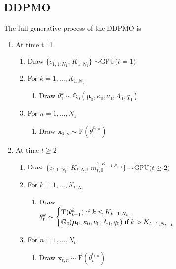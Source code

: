 \documentclass{article}
\begin{document}
\subsection{DDPMO}
\label{sec:ddpmoo_def}
The full generative process of the DDPMO is
\begin{enumerate}
    \item At time t=1
    \begin{enumerate}
        \item Draw $\{ c_{1,1:N_1}$, $K_{1,N_1} \}$ $\sim \text{GPU($t=1$)}$
        \item For $k=1,\ldots,K_{1,N_1}$
        \begin{enumerate}
            \item Draw $\theta_1^k \sim \mathbb{G}_0(\boldsymbol{\mu}_0,\kappa_0,\nu_0,\Lambda_0,q_0)$
        \end{enumerate}
        \item For $n=1,\ldots,N_1$
        \begin{enumerate}
            \item Draw $\mathbf{x}_{1,n} \sim \text{F}(\theta_1^{c_{1,n}})$
        \end{enumerate}
    \end{enumerate}
    \item At time $t \geq 2$
    \begin{enumerate}
        \item Draw $\{ c_{t,1:N_t}$, $K_{t,N_t}$, $m_{t,0}^{1:K_{t-1,N_{t-1}}} \}$ $\sim \text{GPU($t \geq 2$)}$
        \item For $k=1,\ldots,K_{t,N_t}$
        \begin{enumerate}
            \item Draw \\$\theta_t^k \sim
                \begin{cases}
                    \text{T}(\theta_{t-1}^k) \hspace{1mm} \text{if} \hspace{1mm} k \leq K_{t-1,N_{t-1}} \\
                    \mathbb{G}_0(\boldsymbol{\mu}_0,\kappa_0,\nu_0,\Lambda_0,q_0) \hspace{1mm} \text{if} \hspace{1mm} k > K_{t-1,N_{t-1}}
                \end{cases}$
        \end{enumerate}
        \item For $n=1,\ldots,N_t$
        \begin{enumerate}
            \item Draw $\mathbf{x}_{t,n} \sim \text{F}(\theta_t^{c_{t,n}})$
        \end{enumerate}
    \end{enumerate}
\end{enumerate}
\end{document}
